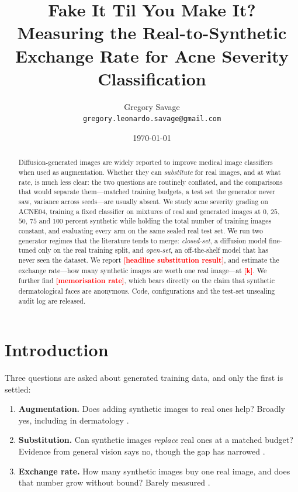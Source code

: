\documentclass[11pt]{article}
\title{Fake It Til You Make It? Measuring the Real-to-Synthetic Exchange Rate
for Acne Severity Classification}
\author{%
  Gregory Savage\\
  \texttt{gregory.leonardo.savage@gmail.com}
}
\date{\today}
\newcommand{\RESULT}[1]{\textcolor{red}{\textbf{[#1]}}}
\begin{document}
\maketitle

\begin{abstract}
Diffusion-generated images are widely reported to improve medical image classifiers
when used as augmentation. Whether they can \emph{substitute} for real images, and at
what rate, is much less clear: the two questions are routinely conflated, and the
comparisons that would separate them---matched training budgets, a test set the
generator never saw, variance across seeds---are usually absent. We study acne
severity grading on ACNE04, training a fixed classifier on mixtures of real and
generated images at $0$, $25$, $50$, $75$ and $100$ percent synthetic while holding
the total number of training images constant, and evaluating every arm on the same
sealed real test set. We run two generator regimes that the literature tends to
merge: \emph{closed-set}, a diffusion model fine-tuned only on the real training
split, and \emph{open-set}, an off-the-shelf model that has never seen the dataset.
We report \RESULT{headline substitution result}, and estimate the exchange
rate---how many synthetic images are worth one real image---at \RESULT{k}. We further
find \RESULT{memorisation rate}, which bears directly on the claim that synthetic
dermatological faces are anonymous. Code, configurations and the test-set unsealing
audit log are released.
\end{abstract}

\section{Introduction}
\label{sec:intro}

Three questions are asked about generated training data, and only the first is
settled:

\begin{enumerate}
  \item \textbf{Augmentation.} Does adding synthetic images to real ones help?
        Broadly yes, including in dermatology \citep{sagers2022,ktena2024}.
  \item \textbf{Substitution.} Can synthetic images \emph{replace} real ones at a
        matched budget? Evidence from general vision says no, though the gap has
        narrowed \citep{sariyildiz2023,fan2024}.
  \item \textbf{Exchange rate.} How many synthetic images buy one real image, and
        does that number grow without bound? Barely measured \citep{wang2025}.
\end{enumerate}
\end{document}
